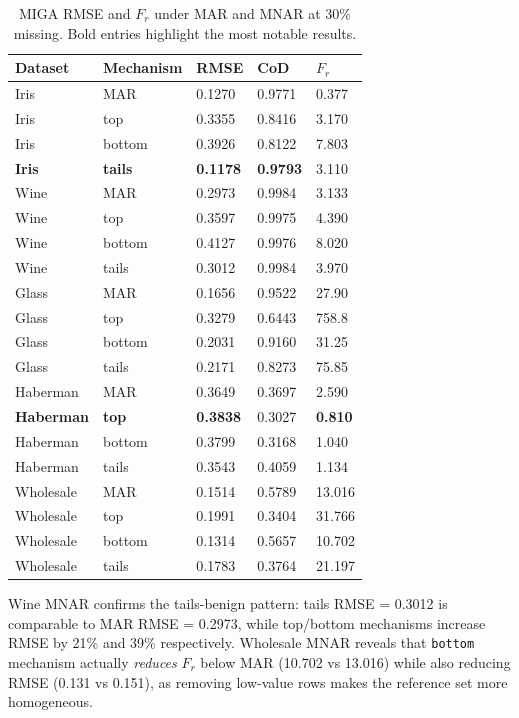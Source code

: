 \begin{table}[h]
\caption{MIGA RMSE and $F_r$ under MAR and MNAR at 30\% missing. Bold entries highlight the most notable results.}
\label{tab:mnar}
\centering
\begin{tabular}{lllll}
\toprule
\textbf{Dataset} & \textbf{Mechanism} & \textbf{RMSE} & \textbf{CoD} & $F_r$ \\
\midrule
Iris        & MAR    & 0.1270 & 0.9771 & 0.377 \\
Iris        & top    & 0.3355 & 0.8416 & 3.170 \\
Iris        & bottom & 0.3926 & 0.8122 & 7.803 \\
\textbf{Iris} & \textbf{tails} & \textbf{0.1178} & \textbf{0.9793} & 3.110 \\
Wine        & MAR    & 0.2973 & 0.9984 & 3.133 \\
Wine        & top    & 0.3597 & 0.9975 & 4.390 \\
Wine        & bottom & 0.4127 & 0.9976 & 8.020 \\
Wine        & tails  & 0.3012 & 0.9984 & 3.970 \\
Glass       & MAR    & 0.1656 & 0.9522 & 27.90 \\
Glass       & top    & 0.3279 & 0.6443 & 758.8 \\
Glass       & bottom & 0.2031 & 0.9160 & 31.25 \\
Glass       & tails  & 0.2171 & 0.8273 & 75.85 \\
Haberman    & MAR    & 0.3649 & 0.3697 & 2.590 \\
\textbf{Haberman} & \textbf{top} & \textbf{0.3838} & 0.3027 & \textbf{0.810} \\
Haberman    & bottom & 0.3799 & 0.3168 & 1.040 \\
Haberman    & tails  & 0.3543 & 0.4059 & 1.134 \\
Wholesale   & MAR    & 0.1514 & 0.5789 & 13.016 \\
Wholesale   & top    & 0.1991 & 0.3404 & 31.766 \\
Wholesale   & bottom & 0.1314 & 0.5657 & 10.702 \\
Wholesale   & tails  & 0.1783 & 0.3764 & 21.197 \\
\bottomrule
\end{tabular}
\end{table}
\noindent\small{Wine MNAR confirms the tails-benign pattern: tails RMSE = 0.3012 is comparable to MAR RMSE = 0.2973, while top/bottom mechanisms increase RMSE by 21\% and 39\% respectively. Wholesale MNAR reveals that \texttt{bottom} mechanism actually \emph{reduces} $F_r$ below MAR (10.702 vs 13.016) while also reducing RMSE (0.131 vs 0.151), as removing low-value rows makes the reference set more homogeneous.}

